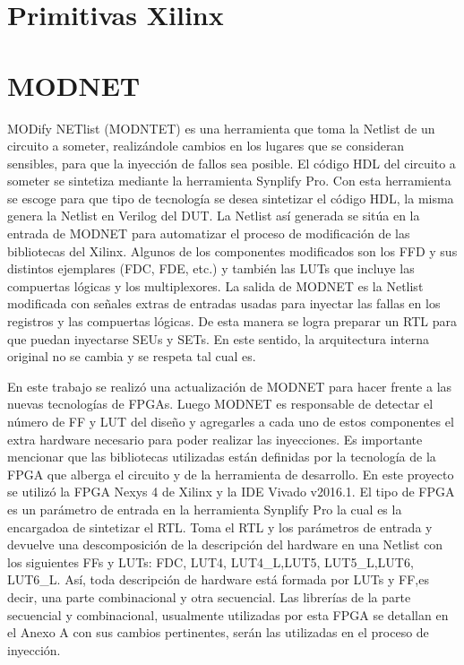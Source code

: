 \documentclass[a4paper,openright,12pt]{report}
\begin{document}
\section{Primitivas Xilinx}
\cite{carmichael2001triple}
\section{MODNET}

MODify NETlist (MODNTET) es una herramienta que toma la Netlist de un circuito a  someter, realizándole cambios en los lugares que se consideran sensibles, para que la inyección de fallos sea posible. 
El código HDL del circuito a someter se sintetiza mediante la herramienta Synplify Pro. Con esta herramienta se escoge para que tipo de tecnología se desea sintetizar el código HDL, la misma genera la Netlist en Verilog del DUT. La Netlist así generada se sitúa en la entrada de MODNET para automatizar el proceso de modificación de las bibliotecas del Xilinx. Algunos de los componentes modificados son los FFD y sus distintos ejemplares (FDC, FDE, etc.) y también las LUTs que incluye las compuertas lógicas y los multiplexores.
La salida de MODNET es la Netlist modificada con  señales extras de entradas usadas para inyectar las fallas en los registros y las compuertas lógicas. De esta manera se logra preparar un RTL para que puedan inyectarse SEUs y SETs. En este sentido, la arquitectura interna original no se cambia y se respeta tal cual es. 

En este trabajo se realizó una actualización de MODNET  para hacer frente a las nuevas tecnologías de FPGAs. Luego MODNET es responsable de detectar el número de FF y LUT del diseño y agregarles a cada uno de estos componentes el extra hardware necesario para poder realizar las inyecciones.
Es importante mencionar que las bibliotecas utilizadas están definidas por la tecnología de la FPGA que alberga el circuito y de la herramienta de desarrollo. En este proyecto se  utilizó la FPGA Nexys 4 de Xilinx y la IDE Vivado v2016.1. El tipo de FPGA es un parámetro de entrada en la herramienta Synplify Pro la cual es la  encargadoa de sintetizar el RTL. Toma el RTL y los parámetros de entrada y  devuelve una descomposición de la descripción del hardware en una Netlist con los siguientes FFs y LUTs: FDC, LUT4, LUT4\_L,LUT5, LUT5\_L,LUT6, LUT6\_L. Así,  toda descripción de hardware está formada por LUTs y FF,es decir,  una parte combinacional y otra secuencial.
Las librerías de la parte secuencial  y  combinacional, usualmente utilizadas por esta FPGA se detallan  en el Anexo A con sus cambios pertinentes,  serán las utilizadas en el proceso  de inyección.
\end{document}
